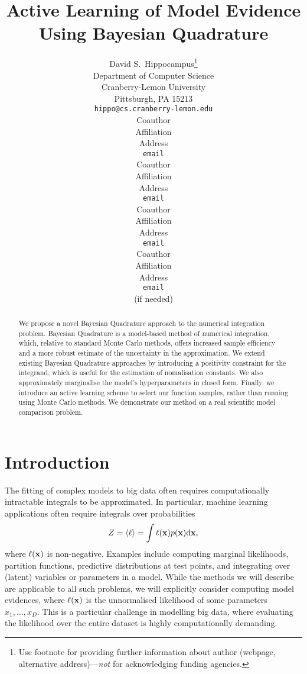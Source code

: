 \documentclass{article} %
\title{Active Learning of Model Evidence \\Using Bayesian Quadrature }
\author{
David S.~Hippocampus\thanks{ Use footnote for providing further information
about author (webpage, alternative address)---\emph{not} for acknowledging
funding agencies.} \\
Department of Computer Science\\
Cranberry-Lemon University\\
Pittsburgh, PA 15213 \\
\texttt{hippo@cs.cranberry-lemon.edu} \\
\And
Coauthor \\
Affiliation \\
Address \\
\texttt{email} \\
\AND
Coauthor \\
Affiliation \\
Address \\
\texttt{email} \\
\And
Coauthor \\
Affiliation \\
Address \\
\texttt{email} \\
\And
Coauthor \\
Affiliation \\
Address \\
\texttt{email} \\
(if needed)\\
}
\begin{document}
 

\maketitle

\begin{abstract} 
We propose a novel Bayesian Quadrature approach to the numerical integration problem. Bayesian Quadrature is a model-based method of numerical integration, which, relative to standard Monte Carlo methods, offers increased sample efficiency and a more robust estimate of the uncertainty in the approximation. We extend existing Bayesian Quadrature approaches by introducing a positivity constraint for the integrand, which is useful for the estimation of nomalisation constants. We also approximately marginalise the model's hyperparameters in closed form. Finally, we introduce an active learning scheme to select our function samples, rather than running using Monte Carlo methods. We demonstrate our method on a real scientific model comparison problem.
\end{abstract} 

\section{Introduction}

The fitting of complex models to big data often requires computationally intractable integrals to be approximated. In particular, machine learning applications often require integrals over probabilities
\begin{equation}\label{eq:ev}
Z = \inty{\lfn} = \int \lfn(\vlfv) p(\vlfv) \ud\vlfv,
\end{equation}
where $\ell(\vlfv)$ is non-negative.  Examples include computing marginal likelihoods, partition functions, predictive distributions at test points, and integrating over (latent) variables or parameters in a model. While the methods we will describe are applicable to all such problems, we will explicitly consider computing model evidences, where $\ell(\vlfv)$ is the unnormalised likelihood of some parameters $x_1, \dots, x_D$. This is a particular challenge in modelling big data, where evaluating the likelihood over the entire dataset is highly computationally demanding. 
\end{document}
